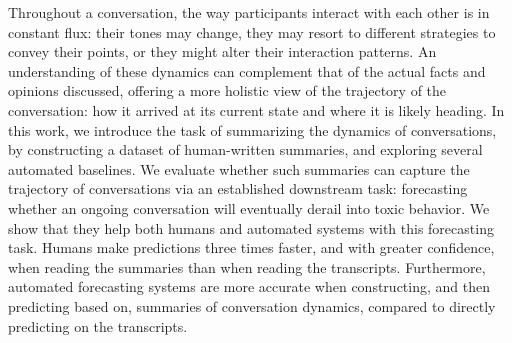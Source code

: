 Throughout a conversation, the way participants interact with each other is in constant flux: their tones may change, they may resort to different strategies to convey their points, or they might alter their interaction patterns. An understanding of these dynamics can complement that of the actual facts and opinions discussed, offering a more holistic view of the trajectory of the conversation: how it arrived at its current state and where it is likely heading. In this work, we introduce the task of summarizing the dynamics of conversations, by constructing a dataset of human-written summaries, and exploring several automated baselines.  We evaluate whether such summaries can capture the trajectory of conversations via an established downstream task: forecasting whether an ongoing conversation will eventually derail into toxic behavior.  We show that they help both humans and automated systems with this forecasting task.  Humans make predictions three times faster, and with greater confidence, when reading the summaries than when reading the transcripts.  Furthermore, automated forecasting systems are more accurate when constructing, and then predicting based on, summaries of conversation dynamics, compared to directly predicting on the transcripts.